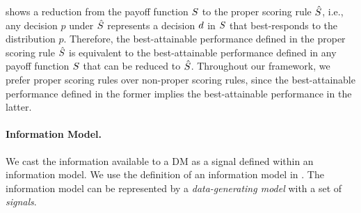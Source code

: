  shows a reduction from the payoff function $S$ to the proper scoring rule $\hat{S}$, i.e., any decision $p$ under $\hat{S}$ represents a decision $d$ in $S$ that best-responds to the distribution $p$.
Therefore, the best-attainable performance defined in the proper scoring rule $\hat{S}$ is equivalent to the best-attainable performance defined in any payoff function $S$ that can be reduced to $\hat{S}$.
Throughout our framework, we prefer proper scoring rules over non-proper scoring rules, since the best-attainable performance defined in the former implies the best-attainable performance in the latter.

\mvspace{-4mm}
\paragraph{Information Model.} 
We cast the information available to a DM as a signal defined within an information model.
We use the definition of an information model in \citet{blackwell1951comparison}. 
The information model can be represented by a \textit{data-generating model} with a set of \textit{signals}.
